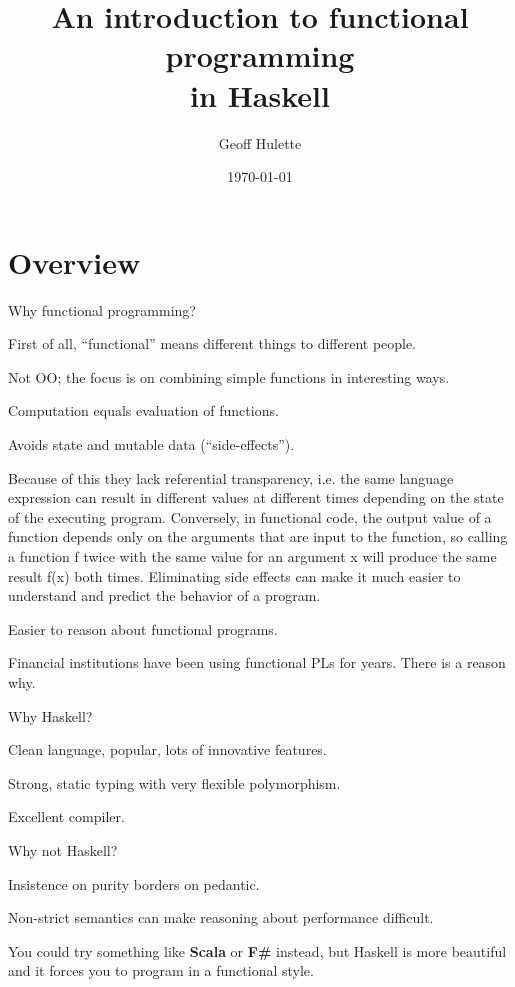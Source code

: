 \documentclass{beamer}
\title{An introduction to functional programming\\in Haskell}
\author{Geoff Hulette}
\date{\today}
\begin{document}
\begin{frame}[plain]
  \titlepage
\end{frame}

\section{Overview}

%
\begin{frame}{Why functional programming?}

First of all, ``functional'' means different things to different people.

Not OO; the focus is on combining simple functions in interesting ways.

Computation equals evaluation of functions.

Avoids state and mutable data (``side-effects''). 

Because of this they lack referential transparency, i.e. the same language
expression can result in different values at different times depending on the
state of the executing program. Conversely, in functional code, the output value
of a function depends only on the arguments that are input to the function, so
calling a function f twice with the same value for an argument x will produce
the same result f(x) both times. Eliminating side effects can make it much
easier to understand and predict the behavior of a program.

Easier to reason about functional programs.

Financial institutions have been using functional PLs for years. There is a
reason why.


\end{frame}

%
\begin{frame}{Why Haskell?}

Clean language, popular, lots of innovative features.

Strong, static typing with very flexible polymorphism.

Excellent compiler.

\end{frame}

%
\begin{frame}{Why not Haskell?}

Insistence on purity borders on pedantic.

Non-strict semantics can make reasoning about performance difficult.

You could try something like \textbf{Scala} or \textbf{F\#} instead, but Haskell
is more beautiful and it forces you to program in a functional style.

\end{frame}
\end{document}
